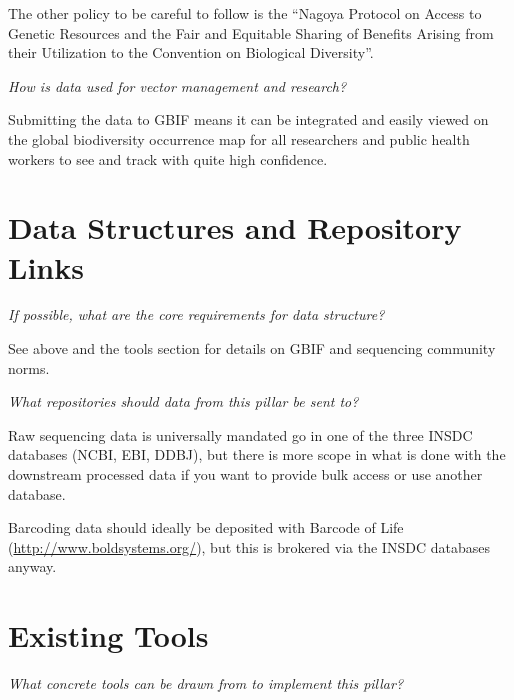 \documentclass[]{article}
\begin{document}
The other policy to be careful to follow is the ``Nagoya Protocol on Access to Genetic Resources and the Fair and Equitable Sharing of Benefits Arising from their Utilization to the Convention on Biological Diversity''.

\emph{How is data used for vector management and research?}

Submitting the data to GBIF means it can be integrated and easily viewed on the global biodiversity occurrence map for all researchers and public health workers to see and track with quite high confidence.

\hypertarget{data-structures-and-repository-links}{%
\section{Data Structures and Repository Links}\label{data-structures-and-repository-links}}

\emph{If possible, what are the core requirements for data structure?}

See above and the tools section for details on GBIF and sequencing community norms.

\emph{What repositories should data from this pillar be sent to?}

Raw sequencing data is universally mandated go in one of the three INSDC databases (NCBI, EBI, DDBJ), but there is more scope in what is done with the downstream processed data if you want to provide bulk access or use another database.

Barcoding data should ideally be deposited with Barcode of Life (\url{http://www.boldsystems.org/}), but this is brokered via the INSDC databases anyway.

\hypertarget{existing-tools}{%
\section{Existing Tools}\label{existing-tools}}

\emph{What concrete tools can be drawn from to implement this pillar?}
\end{document}
